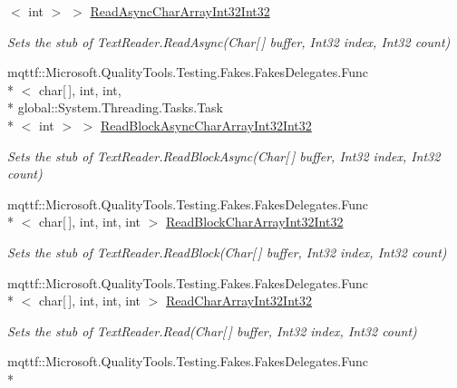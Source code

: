 \begin{DoxyCompactItemize}
$<$ int $>$ $>$ \hyperlink{class_system_1_1_i_o_1_1_fakes_1_1_stub_text_reader_a1ae9d4e28e468e62f947b8bcb00a647f}{Read\-Async\-Char\-Array\-Int32\-Int32}
\begin{DoxyCompactList}\small\item\em Sets the stub of Text\-Reader.\-Read\-Async(\-Char\mbox{[}$\,$\mbox{]} buffer, Int32 index, Int32 count)\end{DoxyCompactList}\item 
mqttf\-::\-Microsoft.\-Quality\-Tools.\-Testing.\-Fakes.\-Fakes\-Delegates.\-Func\\*
$<$ char\mbox{[}$\,$\mbox{]}, int, int, \\*
global\-::\-System.\-Threading.\-Tasks.\-Task\\*
$<$ int $>$ $>$ \hyperlink{class_system_1_1_i_o_1_1_fakes_1_1_stub_text_reader_a02f1dc3f1df304887e24a86fdc055aec}{Read\-Block\-Async\-Char\-Array\-Int32\-Int32}
\begin{DoxyCompactList}\small\item\em Sets the stub of Text\-Reader.\-Read\-Block\-Async(\-Char\mbox{[}$\,$\mbox{]} buffer, Int32 index, Int32 count)\end{DoxyCompactList}\item 
mqttf\-::\-Microsoft.\-Quality\-Tools.\-Testing.\-Fakes.\-Fakes\-Delegates.\-Func\\*
$<$ char\mbox{[}$\,$\mbox{]}, int, int, int $>$ \hyperlink{class_system_1_1_i_o_1_1_fakes_1_1_stub_text_reader_a879e3f5e34c6ab08482e97d255c597d2}{Read\-Block\-Char\-Array\-Int32\-Int32}
\begin{DoxyCompactList}\small\item\em Sets the stub of Text\-Reader.\-Read\-Block(\-Char\mbox{[}$\,$\mbox{]} buffer, Int32 index, Int32 count)\end{DoxyCompactList}\item 
mqttf\-::\-Microsoft.\-Quality\-Tools.\-Testing.\-Fakes.\-Fakes\-Delegates.\-Func\\*
$<$ char\mbox{[}$\,$\mbox{]}, int, int, int $>$ \hyperlink{class_system_1_1_i_o_1_1_fakes_1_1_stub_text_reader_ab7543a2bea16076d9648322fe96e4838}{Read\-Char\-Array\-Int32\-Int32}
\begin{DoxyCompactList}\small\item\em Sets the stub of Text\-Reader.\-Read(\-Char\mbox{[}$\,$\mbox{]} buffer, Int32 index, Int32 count)\end{DoxyCompactList}\item 
mqttf\-::\-Microsoft.\-Quality\-Tools.\-Testing.\-Fakes.\-Fakes\-Delegates.\-Func\\*

\end{DoxyCompactItemize}
